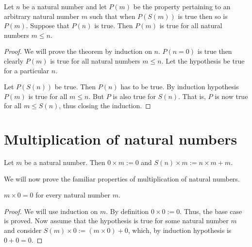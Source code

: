 \begin{thm}\label{c1s4t2}
Let $n$ be a natural number and let $P(m)$ be the property pertaining to
an arbitrary natural number $m$ such that when $P(S(m))$ is true then so is
$P(m)$. Suppose that $P(n)$ is true. Then $P(m)$ is true for all natural
numbers $m \le n$.
\end{thm}
\begin{proof}
We will prove the theorem by induction on $n$. $P(n=0)$ is true then clearly
$P(m)$ is true for all natural numbers $m \le n$. Let the hypothesis be true
for a particular $n$. 

Let $P(S(n))$ be true. Then $P(n)$ has to be true. By induction hypothesis
$P(m)$ is true for all $m \le n$. But $P$ is also true for $S(n)$. That is,
$P$ is now true for all $m \le S(n)$, thus closing the induction.
\end{proof}

\section{Multiplication of natural numbers}\label{c1s5}
\begin{defn}\label{c1s5d1}
Let $m$ be a natural number. Then $0 \times m := 0$ and $S(n) \times m :=
n \times m + m$.
\end{defn}

We will now prove the familiar properties of multiplication of natural
numbers.
\begin{prop}\label{c1s5p1}
$m \times 0 = 0$ for every natural number $m$.
\end{prop}
\begin{proof}
We will use induction on $m$. By definition $0 \times 0 := 0$. Thus, the
base case is proved. Now assume that the hypothesis is true for some 
natural number $m$ and consider $S(m) \times 0 := (m \times 0) + 0$, which,
by induction hypothesis is $0 + 0 = 0$.
\end{proof}

